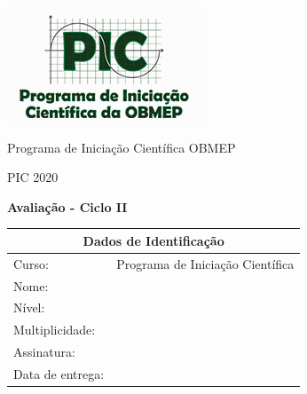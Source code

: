 \documentclass[oneside,a4paper,12pt]{article}
\theoremstyle{Colorido}
\theoremstyle{solu}
\theoremstyle{dotlessP}
\newcommand{\universidade}{Programa de Iniciação Científica OBMEP}
\newcommand{\centro}{PIC 2020}
\newcommand{\professor}{Douglas de Araujo Smigly}
\newcommand{\disciplina}{Programa de Iniciação Científica}
\newcommand{\entrega}{ }
\begin{document}
	\pagestyle{empty}
	
	\begin{center}
	\includegraphics[width=\linewidth/3]{logo_pic}%
	 	\vspace{0pt}
	 	
		\universidade
		\par
		\centro
		\par
		\par
		\par
		\vspace{24pt}
		\LARGE \textbf{Avalia\c c\~ao - Ciclo II}
		
	\end{center}
	
	\vspace{24pt}
	
%		
%	
	

	\begin{tabular}{ |l|p{12cm}| }
		
		\hline
		\multicolumn{2}{|c|}{\textbf{Dados de Identificação}} \\
			\hline
		Curso:        &  \disciplina \\
			\hline
		Nome:        &  \\
		\hline
		Nível:      &  \\
		\hline
				Multiplicidade:      &  \\
		\hline
				Assinatura:      &  \\
		\hline
				Data de entrega:      &  \entrega \\
		\hline
	\end{tabular}
	
\end{document}
